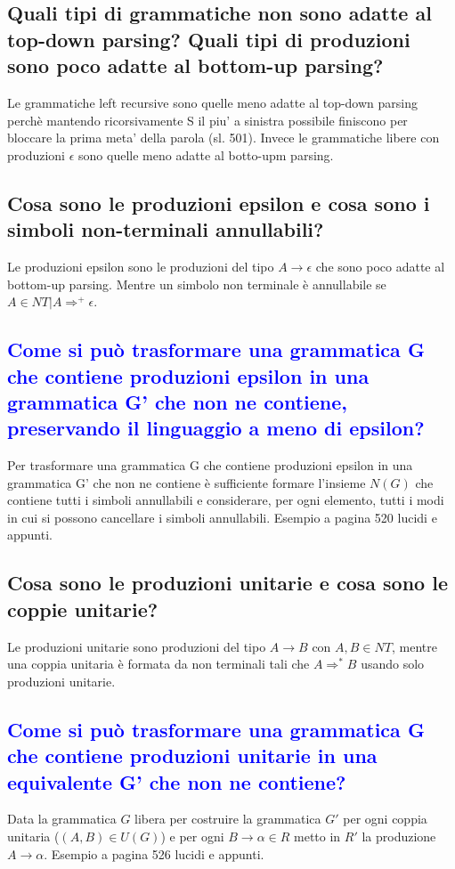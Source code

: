\documentclass{article}
\begin{document}
\subsection{Quali tipi di grammatiche non sono adatte al top-down parsing? Quali tipi di produzioni sono poco adatte al bottom-up parsing?}
Le grammatiche left recursive sono quelle meno adatte al top-down parsing
perchè mantendo ricorsivamente S il piu' a sinistra possibile finiscono per
bloccare la prima meta' della parola (sl. 501). Invece le grammatiche libere
con produzioni $\epsilon$ sono quelle meno adatte al botto-upm parsing.

\subsection{Cosa sono le produzioni epsilon e cosa sono i simboli non-terminali annullabili?}
Le produzioni epsilon sono le produzioni del tipo $A \to \epsilon$ che sono
poco adatte al bottom-up parsing. Mentre un simbolo non terminale è annullabile
se $A \in NT | A \Rightarrow^+ \epsilon$.
\subsection{\textcolor{blue}{Come si può trasformare una grammatica G che contiene produzioni epsilon in una grammatica G' che non ne contiene, preservando il linguaggio a meno di epsilon?}}
Per trasformare una grammatica G che contiene produzioni epsilon in una grammatica G' che non ne contiene è sufficiente formare l'insieme $N(G)$ che contiene tutti i simboli annullabili e considerare, per ogni elemento, tutti i modi in cui si possono
cancellare i simboli annullabili. Esempio a pagina 520 lucidi e appunti.

\subsection{Cosa sono le produzioni unitarie e cosa sono le coppie unitarie?}
Le produzioni unitarie sono produzioni del tipo $ A \to B$ con $A,B \in NT$,
mentre una coppia unitaria è formata da non terminali tali che $A
    \Rightarrow^*B$ usando solo produzioni unitarie.

\subsection{\textcolor{blue}{Come si può trasformare una grammatica G che contiene produzioni unitarie in una equivalente G' che non ne contiene?}}
Data la grammatica $G$ libera per costruire la grammatica $G'$ per ogni coppia unitaria ($(A,B) \in U(G)$) e per ogni $B \to \alpha \in R$ metto in $R'$ la produzione $A \to \alpha$.
Esempio a pagina 526 lucidi e appunti.
\end{document}
